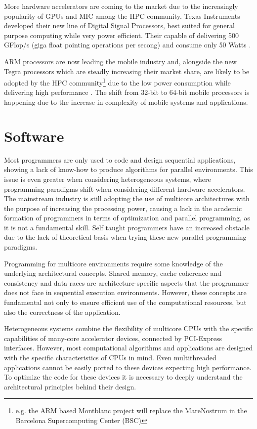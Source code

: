 More hardware accelerators are coming to the market due to the increasingly popularity of GPUs and \intel MIC among the HPC community. Texas Instruments developed their new line of Digital Signal Processors, best suited for general purpose computing while very power efficient. Their capable of delivering 500 GFlop/s (giga float pointing operations per secong) and consume only 50 Watts \cite{Texas:DSP}.

ARM processors are now leading the mobile industry and, alongside the new \nvidia Tegra processors \cite{NVIDIA:Tegra} which are steadly increasing their market share, are likely to be adopted by the HPC community\footnote{e.g. the ARM based Montblanc project will replace the MareNostrum in the Barcelona Supercomputing Center (BSC)} due to the low power consumption while delivering high performance \cite{ARM}. The shift from 32-bit to 64-bit mobile processors is happening due to the increase in complexity of mobile systems and applications.

\section{Software}
\label{Software}

Most programmers are only used to code and design sequential applications, showing a lack of know-how to produce algorithms for parallel environments. This issue is even greater when considering heterogeneous systems, where programming paradigms shift when considering different hardware accelerators. The mainstream industry is still adopting the use of multicore architectures with the purpose of increasing the processing power, causing a lack in the academic formation of programmers in terms of optimization and parallel programming, as it is not a fundamental skill. Self taught programmers have an increased obstacle due to the lack of theoretical basis when trying these new parallel programming paradigms.

Programming for multicore environments require some knowledge of the underlying architectural concepts. Shared memory, cache coherence and consistency and data races are architecture-specific aspects that the programmer does not face in sequential execution environments. However, these concepts are fundamental not only to ensure efficient use of the computational resources, but also the correctness of the application.

Heterogeneous systems combine the flexibility of multicore CPUs with the specific capabilities of many-core accelerator devices, connected by PCI-Express interfaces. However, most computational algorithms and applications are designed with the specific characteristics of CPUs in mind. Even multithreaded applications cannot be easily ported to these devices expecting high performance. To optimize the code for these devices it is necessary to deeply understand the architectural principles behind their design.

